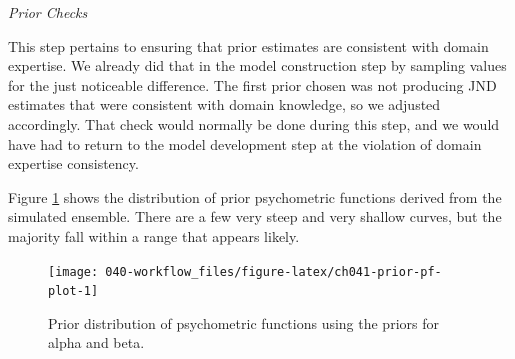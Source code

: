 \documentclass[11pt, oneside, openany]{scrbook}
\newenvironment{Shaded}{\begin{snugshade}}{\end{snugshade}}
\newcommand{\DataTypeTok}[1]{\textcolor[rgb]{0.13,0.29,0.53}{#1}}
\newcommand{\DecValTok}[1]{\textcolor[rgb]{0.00,0.00,0.81}{#1}}
\newcommand{\FloatTok}[1]{\textcolor[rgb]{0.00,0.00,0.81}{#1}}
\newcommand{\KeywordTok}[1]{\textcolor[rgb]{0.13,0.29,0.53}{\textbf{#1}}}
\newcommand{\NormalTok}[1]{#1}
\newcommand{\OperatorTok}[1]{\textcolor[rgb]{0.81,0.36,0.00}{\textbf{#1}}}
\newcommand{\OtherTok}[1]{\textcolor[rgb]{0.56,0.35,0.01}{#1}}
\newcommand{\StringTok}[1]{\textcolor[rgb]{0.31,0.60,0.02}{#1}}
\begin{document}
\begin{Shaded}
\end{Shaded}

\emph{Prior Checks}

This step pertains to ensuring that prior estimates are consistent with domain expertise. We already did that in the model construction step by sampling values for the just noticeable difference. The first prior chosen was not producing JND estimates that were consistent with domain knowledge, so we adjusted accordingly. That check would normally be done during this step, and we would have had to return to the model development step at the violation of domain expertise consistency.

Figure \ref{fig:ch041-prior-pf-plot} shows the distribution of prior psychometric functions derived from the simulated ensemble. There are a few very steep and very shallow curves, but the majority fall within a range that appears likely.

\begin{figure}

{\centering \texttt{[image: 040-workflow\_files/figure-latex/ch041-prior-pf-plot-1]} 

}

\caption{Prior distribution of psychometric functions using the priors for alpha and beta.}\label{fig:ch041-prior-pf-plot}
\end{figure}
\end{document}
